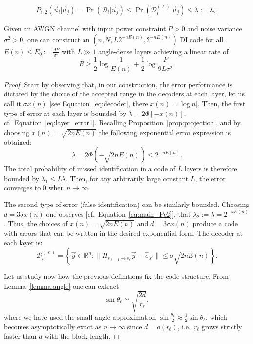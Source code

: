 \documentclass[10pt,a4paper]{amsart}
\newcommand{\RR}{\mathbb{R}}
\newcommand{\cD}{\mathcal{D}}
\begin{document}
\begin{equation}\label{eq:main_Pe2}
P_{e,2}(\vec{u}_i|\vec{u}_j)=\Pr\left(\cD_i|\vec{u}_j\right)\leq\Pr\left(\cD_i^{(\ell)}|\vec{u}_j\right)\leq\lambda:=\lambda_2.
\end{equation}

\begin{theorem}\label{thm:RR}
Given an AWGN channel with input power constraint $P>0$ and noise variance $\sigma^2>0$, one can construct an $(n,N,L2^{-nE(n)},2^{-nE(n)})$ DI code for all $E(n)\leq E_0:=\frac{9P}{\sigma^2}$ with $L\gg1$ angle-dense layers achieving a linear rate of
\[
R\geq \frac12\log\frac{1}{E(n)}+\frac12\log\frac{P}{9L\sigma^2}.
\]
\end{theorem}

\begin{proof}
Start by observing that, in our construction, the error performance is dictated by the choice of the accepted range in the decoders at each layer, let us call it $\sigma x(n)$ [see Equation~\eqref{eq:decoder}, there $x(n)=\log n$]. Then, the first type of error at each layer is bounded by $\lambda=2\Phi[-x(n)]$, cf.~Equation~\eqref{eq:layer_error1}. Recalling Proposition~\ref{prop:projection}, and by choosing $x(n)=\sqrt{2nE(n)}$ the following exponential error expression is obtained:
\begin{equation}
\lambda=2\Phi\left(-\sqrt{2nE(n)}\right)\leq 2^{-nE(n)}.
\end{equation}
The total probability of missed identification in a code of $L$ layers is therefore bounded by $\lambda_1\leq L\lambda$. Then, for any arbitrarily large constant $L$, the error converges to 0 when $n\to\infty$.

The second type of error (false identification) can be similarly bounded. Choosing $d=3\sigma x(n)$ one observes [cf.~Equation~\ref{eq:main_Pe2}], that $\lambda_2:=\lambda=2^{-nE(n)}$. Thus, the choices of $x(n)=\sqrt{2nE(n)}$ and $d=3\sigma x(n)$ produce a code with errors that can be written in the desired exponential form. The decoder at each layer is:
\begin{equation}\label{eq:RR_decoder}
\cD_{i}^{(\ell)}=\left\{\vec{y}\in\RR^n:\|\Pi_{s_{\ell-1}\to s_{\ell}}\vec{y}-\vec{o}_{s^\ell}\|\leq\sigma\sqrt{2nE(n)}\right\}.
\end{equation}

Let us study now how the previous definitions fix the code structure. From Lemma~\ref{lemma:angle} one can extract 
\begin{equation}\label{eq:sin1}
    \sin \theta_\ell\simeq\sqrt{\frac{2d}{r_\ell}},
\end{equation}
where we have used the small-angle approximation $\sin\frac{\theta_{\ell}}{2}\approx\frac12\sin\theta_{\ell}$, which becomes asymptotically exact as $n\to\infty$ since $d=o(r_\ell)$, i.e.~$r_\ell$ grows strictly faster than $d$ with the block length. 


\end{proof}
\end{document}
